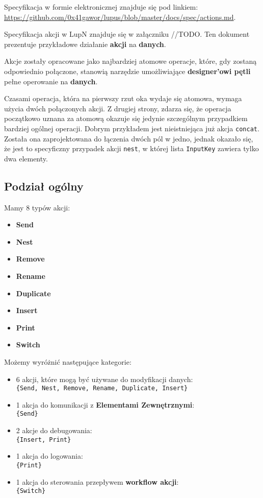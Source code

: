 \label{appendix:6}

Specyfikacja w formie elektronicznej znajduje się pod linkiem: \url{https://github.com/0x41gawor/lupus/blob/master/docs/spec/actions.md}.

Specyfikacja akcji w LupN znajduje się w załączniku //TODO. Ten dokument prezentuje przykładowe działanie \textbf{akcji} na \textbf{danych}.

Akcje zostały opracowane jako najbardziej atomowe operacje, które, gdy zostaną odpowiednio połączone, stanowią narzędzie umożliwiające \textbf{designer'owi pętli} pełne operowanie na \textbf{danych}.

Czasami operacja, która na pierwszy rzut oka wydaje się atomowa, wymaga użycia dwóch połączonych akcji. Z drugiej strony, zdarza się, że operacja początkowo uznana za atomową okazuje się jedynie szczególnym przypadkiem bardziej ogólnej operacji. Dobrym przykładem jest nieistniejąca już akcja \texttt{concat}. Została ona zaprojektowana do łączenia dwóch pól w jedno, jednak okazało się, że jest to specyficzny przypadek akcji \texttt{nest}, w której lista \texttt{InputKey} zawiera tylko dwa elementy.

\subsection{Podział ogólny}

Mamy 8 typów akcji:

\begin{itemize}
    \item \textbf{Send}
    \item \textbf{Nest}
    \item \textbf{Remove}
    \item \textbf{Rename}
    \item \textbf{Duplicate}
    \item \textbf{Insert}
    \item \textbf{Print}
    \item \textbf{Switch}
\end{itemize}

Możemy wyróżnić następujące kategorie:

\begin{itemize}
    \item 6 akcji, które mogą być używane do modyfikacji danych: \\ 
          \texttt{\{Send, Nest, Remove, Rename, Duplicate, Insert\}}
    \item 1 akcja do komunikacji z \textbf{Elementami Zewnętrznymi}: \\ 
          \texttt{\{Send\}}
    \item 2 akcje do debugowania: \\ 
          \texttt{\{Insert, Print\}}
    \item 1 akcja do logowania: \\ 
          \texttt{\{Print\}}
    \item 1 akcja do sterowania przepływem \textbf{workflow akcji}: \\ 
          \texttt{\{Switch\}}
\end{itemize}
